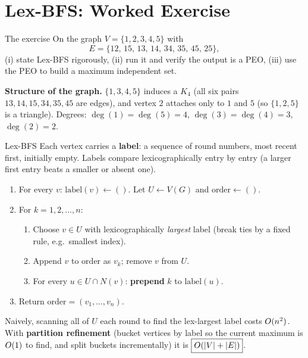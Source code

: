 \section{Lex-BFS: Worked Exercise}

\begin{prob}{The exercise}
On the graph $V=\{1,2,3,4,5\}$ with
\[
  E=\{12,\,15,\,13,\,14,\,34,\,35,\,45,\,25\},
\]
(i) state Lex-BFS rigorously, (ii) run it and verify the output is a PEO, (iii) use the PEO to
build a maximum independent set.
\end{prob}

\noindent\textbf{Structure of the graph.} $\{1,3,4,5\}$ induces a $K_4$ (all six pairs
$13,14,15,34,35,45$ are edges), and vertex $2$ attaches only to $1$ and $5$ (so $\{1,2,5\}$ is a
triangle). Degrees: $\deg(1)=\deg(5)=4$, $\deg(3)=\deg(4)=3$, $\deg(2)=2$.

\begin{algo}{Lex-BFS}
Each vertex carries a \textbf{label}: a sequence of round numbers, most recent first, initially
empty. Labels compare lexicographically entry by entry (a larger first entry beats a smaller or
absent one).
\begin{enumerate}
  \item For every $v$: $\mathrm{label}(v)\leftarrow()$. Let $U\leftarrow V(G)$ and
        $\mathrm{order}\leftarrow()$.
  \item For $k=1,2,\dots,n$:
        \begin{enumerate}
          \item Choose $v\in U$ with lexicographically \emph{largest} label (break ties by a
                fixed rule, e.g.\ smallest index).
          \item Append $v$ to $\mathrm{order}$ as $v_k$; remove $v$ from $U$.
          \item For every $u\in U\cap N(v)$: \textbf{prepend} $k$ to $\mathrm{label}(u)$.
        \end{enumerate}
  \item Return $\mathrm{order}=(v_1,\dots,v_n)$.
\end{enumerate}
\end{algo}

\begin{cplx}
Naively, scanning all of $U$ each round to find the lex-largest label costs $O(n^2)$. With
\textbf{partition refinement} (bucket vertices by label so the current maximum is $O(1)$ to find,
and split buckets incrementally) it is $\boxed{O(|V|+|E|)}$.
\end{cplx}

